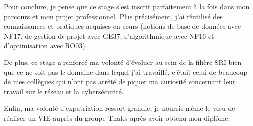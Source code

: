 
Pour conclure, je pense que ce stage s'est inscrit parfaitement à la fois dans mon parcours et mon projet professionnel.
Plus précisément, j'ai réutilisé des connaissances et pratiques acquises en cours (notions de base de données avec NF17, de gestion de projet avec GE37, d'algorithmique avec NF16 et d'optimisation avec RO03).

De plus, ce stage a renforcé ma volonté d'évoluer au sein de la filière SRI bien que ce ne soit pas le domaine dans lequel j'ai travaillé, c'était celui de beaucoup de mes collègues qui n'ont pas arrêté de piquer ma curiosité concernant leur travail sur le réseau et la cybersécurité.

Enfin, ma volonté d'expatriation ressort grandie, je nourris même le vœu de réaliser un VIE auprès du groupe Thales après avoir obtenu mon diplôme.
